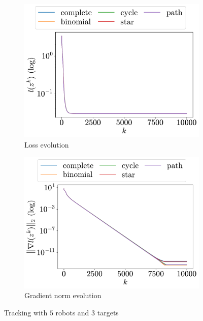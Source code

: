 \documentclass[a4paper,11pt,oneside]{book}
\begin{document}
\begin{figure}[H]
      \centering
      \begin{subfigure}[t]{0.46\linewidth}
            \centering
            \includegraphics[width=\linewidth]{./figs/tracking/5_3_2/loss.pdf} 
            \caption{Loss evolution}
      \end{subfigure}
      \hfill
      \begin{subfigure}[t]{0.46\linewidth}
            \centering
            \includegraphics[width=\linewidth]{./figs/tracking/5_3_2/gradient.pdf} 
            \caption{Gradient norm evolution}
      \end{subfigure}
      \caption{Tracking with $5$ robots and $3$ targets}
      \label{fig:tracking_5_3}
\end{figure}
\end{document}

